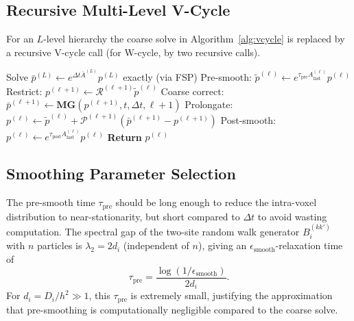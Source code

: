 \documentclass[review,onefignum,onetabnum]{siamart171218}
\newcommand{\calR}{\mathcal{R}}
\newcommand{\calP}{\mathcal{P}}
\begin{document}
\subsection{Recursive Multi-Level V-Cycle}

For an $L$-level hierarchy the coarse solve in
Algorithm~\ref{alg:vcycle} is replaced by a recursive V-cycle
call (for W-cycle, by two recursive calls).

\begin{algorithm}[H]
  \caption{$L$-Level Multigrid V-Cycle
    $\mathbf{MG}(p^{(\ell)}, t, \Delta t, \ell)$}
  \label{alg:vcycle-l}
  \begin{algorithmic}[1]
      \STATE Solve $\bar{p}^{(L)} \leftarrow e^{\Delta t \bar{A}^{(L)}} p^{(L)}$ exactly (via FSP)
    \ELSE
      \STATE Pre-smooth: $\tilde{p}^{(\ell)} \leftarrow e^{\tau_{\mathrm{pre}} A_{\mathrm{fast}}^{(\ell)}} p^{(\ell)}$
      \STATE Restrict: $p^{(\ell+1)} \leftarrow \calR^{(\ell+1)} \tilde{p}^{(\ell)}$
      \STATE Coarse correct: $\bar{p}^{(\ell+1)} \leftarrow \mathbf{MG}(p^{(\ell+1)}, t, \Delta t, \ell+1)$
      \STATE Prolongate: $p^{(\ell)} \leftarrow \tilde{p}^{(\ell)} + \calP^{(\ell+1)}(\bar{p}^{(\ell+1)} - p^{(\ell+1)})$
      \STATE Post-smooth: $p^{(\ell)} \leftarrow e^{\tau_{\mathrm{post}} A_{\mathrm{fast}}^{(\ell)}} p^{(\ell)}$
    \ENDIF
    \STATE \textbf{Return} $p^{(\ell)}$
  \end{algorithmic}
\end{algorithm}

\subsection{Smoothing Parameter Selection}

The pre-smooth time $\tau_{\mathrm{pre}}$ should be long enough to
reduce the intra-voxel distribution to near-stationarity, but
short compared to $\Delta t$ to avoid wasting computation.  The
spectral gap of the two-site random walk generator $B_i^{(kk')}$
with $n$ particles is $\lambda_2 = 2d_i$ (independent of $n$),
giving an $\epsilon_{\mathrm{smooth}}$-relaxation time of
\begin{equation}
  \label{eq:smooth-time}
  \tau_{\mathrm{pre}} = \frac{\log(1/\epsilon_{\mathrm{smooth}})}{2d_i}.
\end{equation}
For $d_i = D_i/h^2 \gg 1$, this $\tau_{\mathrm{pre}}$ is
extremely small, justifying the approximation that pre-smoothing
is computationally negligible compared to the coarse solve.
\end{document}
